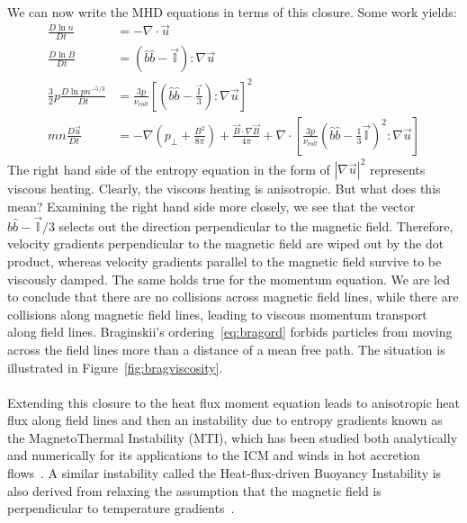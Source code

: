 \\
We can now write the MHD equations in terms of this closure. Some work yields:
\begin{align*}
  \frac{D\ln n}{Dt}&=-\nabla\cdot\vec u\\
  \frac{D\ln B}{Dt}&=(\hat b\hat b-\mathbb{\vec I}):\nabla\vec u\\
  \frac32p\frac{D\ln pn^{-5/3}}{Dt}&=\frac{3p}{\nu_{coll}}\left[\left(\hat b\hat b-\frac{\vec{\mathbb{I}}}3\right):\nabla\vec u\right]^2\\
  mn\frac{D\vec u}{Dt}&=-\nabla\left(p_\perp+\frac{B^2}{8\pi}\right)+\frac{\vec B\cdot\nabla\vec B}{4\pi}+\nabla\cdot\left[\frac{3p}{\nu_{coll}}\left(\hat b\hat b-\frac13\vec{\mathbb{I}}\right)^2:\nabla\vec u\right]
\end{align*}
The right hand side of the entropy equation in the form of $|\nabla\vec u|^2$ represents viscous heating. Clearly, the viscous heating is anisotropic. But what does this mean? Examining the right hand side more closely, we see that the vector $\hat b\hat b-\vec{\mathbb{I}}/3$ selects out the direction perpendicular to the magnetic field. Therefore, velocity gradients perpendicular to the magnetic field are wiped out by the dot product, whereas velocity gradients parallel to the magnetic field survive to be viscously damped. The same holds true for the momentum equation. We are led to conclude that there are no collisions across magnetic field lines, while there are collisions along magnetic field lines, leading to viscous momentum transport along field lines. Braginskii's ordering~\ref{eq:bragord} forbids particles from moving across the field lines more than a distance of a mean free path. The situation is illustrated in Figure~\ref{fig:bragviscosity}.\\
\\
Extending this closure to the heat flux moment equation leads to anisotropic heat flux along field lines and then an instability due to entropy gradients known as the MagnetoThermal Instability (MTI), which has been studied both analytically and numerically for its applications to the ICM and winds in hot accretion flows~\cite{KunzBraginskii,Balbus2000,Balbus2001,Kunz2011,Parrish2007,Parrish2005,Johnson2007,Bu2016}. A similar instability called the Heat-flux-driven Buoyancy Instability is also derived from relaxing the assumption that the magnetic field is perpendicular to temperature gradients~\cite{Quataert2008,Parrish2008a,Kunz2011}.

